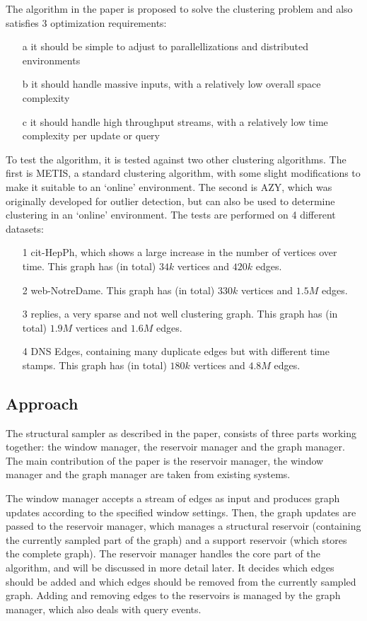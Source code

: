 \documentclass[a4paper]{article}
\begin{document}
The algorithm in the paper is proposed to solve the clustering problem and also satisfies 3 optimization requirements:
\begin{itemize}
\item[a] it should be simple to adjust to parallellizations and distributed environments
\item[b] it should handle massive inputs, with a relatively low overall space complexity
\item[c] it should handle high throughput streams, with a relatively low time complexity per update or query
\end{itemize}

To test the algorithm, it is tested against two other clustering algorithms. The first is METIS, a standard clustering algorithm, with some slight modifications to make it suitable to an `online' environment. The second is AZY, which was originally developed for outlier detection, but can also be used to determine clustering in an `online' environment. The tests are performed on 4 different datasets:
\begin{itemize}
\item[1] cit-HepPh, which shows a large increase in the number of vertices over time. This graph has (in total) $34k$ vertices and $420k$ edges.
\item[2] web-NotreDame. This graph has (in total) $330k$ vertices and $1.5M$ edges.
\item[3] replies, a very sparse and not well clustering graph. This graph has (in total) $1.9M$ vertices and $1.6M$ edges.
\item[4] DNS Edges, containing many duplicate edges but with different time stamps. This graph has (in total) $180k$ vertices and $4.8M$ edges.
\end{itemize}

\subsection{Approach}\label{sec:approach}
The structural sampler as described in the paper, consists of three parts working together: the window manager, the reservoir manager and the graph manager. The main contribution of the paper is the reservoir manager, the window manager and the graph manager are taken from existing systems.

The window manager accepts a stream of edges as input and produces graph updates according to the specified window settings. Then, the graph updates are passed to  the reservoir manager, which manages a structural reservoir (containing the currently sampled part of the graph) and a support reservoir (which stores the complete graph). The reservoir manager handles the core part of the algorithm, and will be discussed in more detail later. It decides which edges should be added and which edges should be removed from the currently sampled graph. Adding and removing edges to the reservoirs is managed by the graph manager, which also deals with query events.
\end{document}

